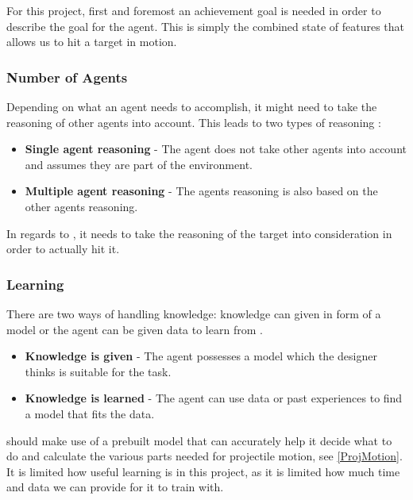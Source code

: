 For this project, first and foremost an achievement goal is needed in order to
describe the goal for the agent. This is simply the combined state of features
that allows us to hit a target in motion. 

\subsubsection{Number of Agents}
Depending on what an agent needs to accomplish, it might need to take the
reasoning of other agents into account. This leads to two types of reasoning
\citep[ch.1.5.6]{MIBook}:
\begin{itemize}
  \item \textbf{Single agent reasoning} - The agent does not take other
  agents into account and assumes they are part of the environment.
  \item \textbf{Multiple agent reasoning} - The agents reasoning is also based
  on the other agents reasoning.
\end{itemize}

In regards to \namep, it needs to take the reasoning of the target into
consideration in order to actually hit it.


\subsubsection{Learning}
There are two ways of handling knowledge: knowledge can given in form of a
model or the agent can be given data to learn from \citep[ch.1.5.7]{MIBook}. 
\begin{itemize}
  \item \textbf{Knowledge is given} - The agent possesses a model which the
designer thinks is suitable for the task.
  \item \textbf{Knowledge is learned} - The agent can use data or past
  experiences to find a model that fits the data.
\end{itemize}

\name should make use of a prebuilt model that can accurately help it decide
what to do and calculate the various parts needed for projectile motion, see
\autoref{ProjMotion}. It is limited how useful learning is in this project, as
it is limited how much time and data we can provide for it to train with.

